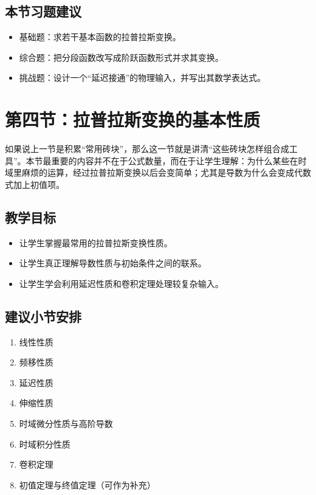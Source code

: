 \subsection*{本节习题建议}
\begin{itemize}
    \item 基础题：求若干基本函数的拉普拉斯变换。
    \item 综合题：把分段函数改写成阶跃函数形式并求其变换。
    \item 挑战题：设计一个``延迟接通''的物理输入，并写出其数学表达式。
\end{itemize}

\section{第四节：拉普拉斯变换的基本性质}

\begin{wulibj}[本节要解决的问题]
如果说上一节是积累``常用砖块''，那么这一节就是讲清``这些砖块怎样组合成工具''。本节最重要的内容并不在于公式数量，而在于让学生理解：为什么某些在时域里麻烦的运算，经过拉普拉斯变换以后会变简单；尤其是导数为什么会变成代数式加上初值项。
\end{wulibj}

\subsection*{教学目标}
\begin{itemize}
    \item 让学生掌握最常用的拉普拉斯变换性质。
    \item 让学生真正理解导数性质与初始条件之间的联系。
    \item 让学生学会利用延迟性质和卷积定理处理较复杂输入。
\end{itemize}

\subsection*{建议小节安排}
\begin{enumerate}
    \item 线性性质
    \item 频移性质
    \item 延迟性质
    \item 伸缩性质
    \item 时域微分性质与高阶导数
    \item 时域积分性质
    \item 卷积定理
    \item 初值定理与终值定理（可作为补充）
\end{enumerate}

